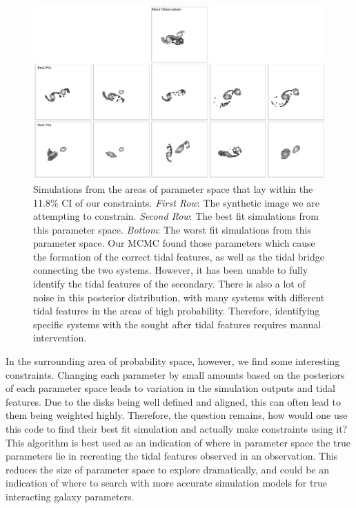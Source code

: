 \begin{figure}
    \centering
    \includegraphics[width=\textwidth]{Chapter1/figures/best-fits-comb.pdf}
    \caption[Simulations from the areas of parameter space that lay within the 11.8\% CI of our constraints.]{Simulations from the areas of parameter space that lay within the 11.8\% CI of our constraints. \textit{First Row}: The synthetic image we are attempting to constrain. \textit{Second Row}: The best fit simulations from this parameter space. \textit{Bottom}: The worst fit simulations from this parameter space. Our MCMC found those parameters which cause the formation of the correct tidal features, as well as the tidal bridge connecting the two systems. However, it has been unable to fully identify the tidal features of the secondary. There is also a lot of noise in this posterior distribution, with many systems with different tidal features in the areas of high probability. Therefore, identifying specific systems with the sought after tidal features requires manual intervention.}
    \label{fig:arp240_corner_plot}
\end{figure}

In the surrounding area of probability space, however, we find some interesting constraints. Changing each parameter by small amounts based on the posteriors of each parameter space leads to variation in the simulation outputs and tidal features. Due to the disks being well defined and aligned, this can often lead to them being weighted highly. Therefore, the question remains, how would one use this code to find their best fit simulation and actually make constraints using it? This algorithm is best used as an indication of where in parameter space the true parameters lie in recreating the tidal features observed in an observation. This reduces the size of parameter space to explore dramatically, and could be an indication of where to search with more accurate simulation models for true interacting galaxy parameters.

